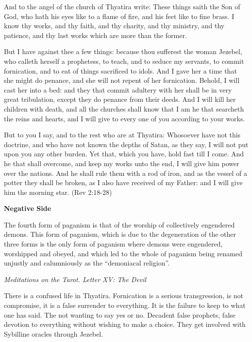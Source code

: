 And to the angel of the church of Thyatira write: These things saith the Son of God, who hath his eyes like to a flame
of fire, and his feet like to fine brass. I know thy works, and thy faith, and thy charity, and thy ministry, and thy
patience, and thy last works which are more than the former.

But I have against thee a few things: because thou sufferest the woman Jezebel, who calleth herself a prophetess, to
teach, and to seduce my servants, to commit fornication, and to eat of things sacrificed to idols. And I gave her a
time that she might do penance, and she will not repent of her fornication. Behold, I will cast her into a bed: and
they that commit adultery with her shall be in very great tribulation, except they do penance from their deeds. And I
will kill her children with death, and all the churches shall know that I am he that searcheth the reins and hearts,
and I will give to every one of you according to your works.

But to you I say, and to the rest who are at Thyatira: Whosoever have not this doctrine, and who have not known the
depths of Satan, as they say, I will not put upon you any other burden. Yet that, which you have, hold fast till I
come. And he that shall overcome, and keep my works unto the end, I will give him power over the nations. And he shall
rule them with a rod of iron, and as the vessel of a potter they shall be broken, as I also have received of my Father:
and I will give him the morning star. (Rev 2:18-28)

\textbf{Negative Side}

\begin{quotationx}
The fourth form of paganism is that of the worship of collectively engendered demons. This form of paganism, which is
due to the degeneration of the other three forms is the only form of paganism where demons were engendered, worshipped
and obeyed, and which led to the whole of paganism being renamed unjustly and calumniously as the “demoniacal
religion”. \begin{flushright} \emph{Meditations on the Tarot. Letter XV: The Devil}\end{flushright}

\end{quotationx}

There is a confused life in Thyatira. Fornication is a serious transgression, is not compromise, it is a false surrender
to everything. It is the failure to keep to what one has said. The not wanting to say yes or no. Decadent false
prophets, false devotion to everything without wishing to make a choice. They get involved with Sybilline oracles
through Jezebel.

